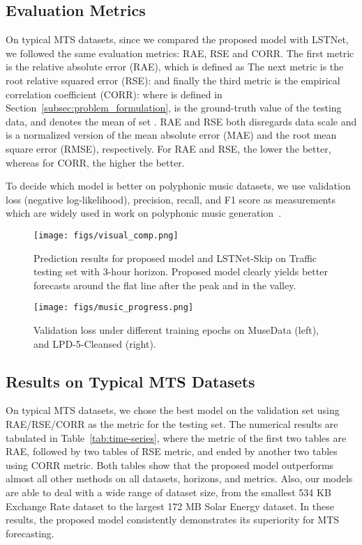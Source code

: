 \subsection{Evaluation Metrics}

On typical MTS datasets, since we compared the proposed model with LSTNet, we followed the same evaluation metrics: RAE, RSE and CORR.
The first metric is the relative absolute error (RAE), which is defined as
{ 
}
The next metric is the root relative squared error (RSE):
{ 
}
and finally the third metric is the empirical correlation coefficient (CORR):
{ 
}
where  is defined in Section~\ref{subsec:problem_formulation},  is the ground-truth value of the testing data, and  denotes the mean of set .
RAE and RSE both disregards data scale and is a normalized version of the mean absolute error (MAE) and the root mean square error (RMSE), respectively.
For RAE and RSE, the lower the better, whereas for CORR, the higher the better.

To decide which model is better on polyphonic music datasets,
we use validation loss (negative log-likelihood), precision, recall, and F1 score as measurements
which are widely used in work on polyphonic music generation~\cite{musedata,tonnetz}.

\begin{figure}
 \centering
 \texttt{[image: figs/visual\_comp.png]}
 \caption{Prediction results for proposed model and LSTNet-Skip on Traffic testing set with 3-hour horizon. Proposed model clearly yields better forecasts around the flat line after the peak and in the valley.}
 \label{fig:visual_comp}
\end{figure}

\begin{figure}
  \centering
  \texttt{[image: figs/music\_progress.png]}
  \caption{Validation loss under different training epochs on MuseData (left), and LPD-5-Cleansed (right).}
  \label{fig:learning_process}
\end{figure}

\subsection{Results on Typical MTS Datasets}
On typical MTS datasets, we chose the best model on the validation set using RAE/RSE/CORR as the metric for the testing set.
The numerical results are tabulated in Table~\ref{tab:time-series}, where the metric of the first two tables are RAE, followed by two tables of RSE metric, and ended by another two tables using CORR metric.
Both tables show that the proposed model outperforms almost all other methods on all datasets, horizons, and metrics.
Also, our models are able to deal with a wide range of dataset size, from the smallest 534 KB Exchange Rate dataset to the largest 172 MB Solar Energy dataset.
In these results, the proposed model consistently demonstrates its superiority for MTS forecasting.


